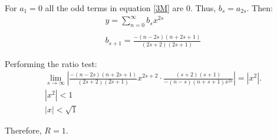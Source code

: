 \documentclass{article}
\begin{document}
For $a_1 = 0$ all the odd terms in equation \ref{3M} are 0. Thus,  $b_s = a_{2s}$.
Then:
\begin{align*}
y = \sum_{n=0}^{\infty} b_s x^{2s}\\\\
b_{s+1} =  \frac{-(n-2s)(n+2s+1)}{(2s+2)(2s+1)}
\end{align*}

Performing the ratio test:
\begin{align*}
\lim_{s\to\infty}\left| \frac{-(n-2s)(n+2s+1)}{(2s+2)(2s+1)} x^{2s+2} \cdot \frac{(s+2)(s+1)}{-(n-s)(n+s+1)x^{2s}}\right| = \left|x^2\right|.\\
\left|x^2\right| < 1\\
\left|x\right| < \sqrt{1}
\end{align*}

Therefore, $R = 1$.
\end{document}
